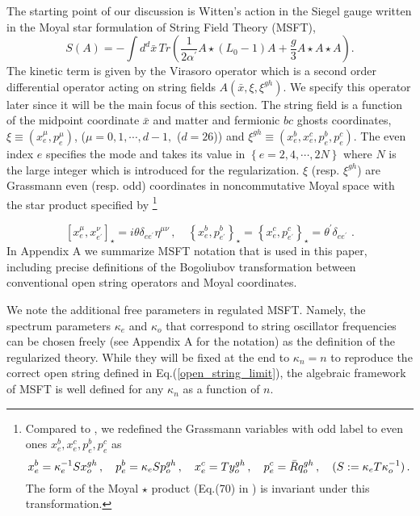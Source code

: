 \documentclass[a4paper,aps,preprint,nofootinbib,eqsecnum]{revtex4}
\begin{document}
The starting point of our discussion is Witten's action in the Siegel gauge
written in the Moyal star formulation of String Field Theory (MSFT),
\begin{equation}
S\left( A\right) =-\int d^{d}\bar{x}\,Tr\left( \frac{1}{2\alpha ^{\prime }}%
A\star (L_{0}-1)A+\frac{g}{3}A\star A\star A\right) .  \label{action}
\end{equation}%
The kinetic term is given by the Virasoro operator which is a second order
differential operator acting on string fields $A\left( \bar{x},\xi ,\xi
^{gh}\right) $. We specify this operator later since it will be the main
focus of this section. The string field is a function of the midpoint
coordinate $\bar{x}$ and matter and fermionic $bc$ ghosts coordinates, $\xi
\equiv \left( x_{e}^{\mu },p_{e}^{\mu }\right) $, ($\mu =0,1,\cdots ,d-1,$ ($%
d=26$)) and $\xi ^{gh}\equiv \left(
x_{e}^{b},x_{e}^{c},p_{e}^{b},p_{e}^{c}\right) $. The even index $e$
specifies the mode and takes its value in $\left\{ e=2,4,\cdots ,2N\right\} $
where $N$ is the large integer which is introduced for the regularization. $%
\xi $ (resp. $\xi ^{gh}$) are Grassmann even (resp. odd) coordinates in
noncommutative Moyal space with the star product specified by \cite{B, BKM1,
PREP, Erler}\footnote{%
Compared to \cite{BKM1}, we redefined the Grassmann variables
with odd label to even
ones $x_{e}^{b},x_{e}^{c},p_{e}^{b},p_{e}^{c}$ as
\begin{equation}
x_{e}^{b}=\kappa _{e}^{-1}Sx_{o}^{gh}\,,\quad p_{e}^{b}=\kappa
_{e}Sp_{o}^{gh}\,,\quad x_{e}^{c}=Ty_{o}^{gh}\,,\quad p_{e}^{c}=\bar{R}%
q_{o}^{gh}\,,\quad (S:=\kappa _{e}T\kappa _{o}^{-1})\,.  \notag
\end{equation}%
The form of the Moyal $\star $ product (Eq.(70) in \cite{BKM1}) is invariant
under this transformation.}

\begin{equation}
\left[ x_{e}^{\mu },x_{e^{\prime }}^{\nu }\right] _{\star }=i\theta \delta
_{ee^{\prime }}\eta ^{\mu \nu }\,,\quad \left\{ x_{e}^{b},p_{e^{\prime
}}^{b}\right\} _{\star }=\left\{ x_{e}^{c},p_{e^{\prime }}^{c}\right\}
_{\star }={\theta ^{\prime }}\delta _{ee^{\prime }}\,\,.
\label{star_product}
\end{equation}%
In Appendix A we summarize MSFT notation that is used in this paper,
including precise definitions of the Bogoliubov transformation between
conventional open string operators and Moyal coordinates.

We note the additional free parameters in regulated MSFT. Namely, the
spectrum parameters $\kappa _{e}$ and $\kappa _{o}$ that correspond to
string oscillator frequencies can be chosen freely (see Appendix A for the
notation) as the definition of the regularized theory. While they will be
fixed at the end to $\kappa _{n}=n$ to reproduce the correct open string
defined in Eq.(\ref{open_string_limit}), the algebraic framework of MSFT is
well defined for any $\kappa _{n}$ as a function of $n.$
\end{document}
